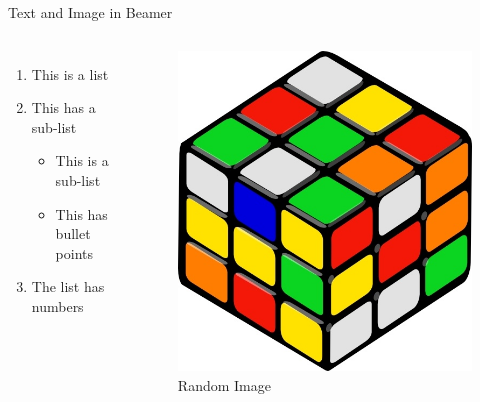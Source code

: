 \begin{frame}{Text and Image in Beamer}
    \begin{columns}
        \begin{enumerate}
            \item This is a list
            \item This has a sub-list
                \begin{itemize}
                    \item This is a sub-list
                    \item This has bullet points
                \end{itemize}
            \item The list has numbers    
        \end{enumerate}
        \begin{figure}
        \centering
        \includegraphics[scale=0.2]{images/illustrate/illus1.jpg}
        \caption{Random Image}
        \end{figure}
    \end{columns}
\end{frame}

